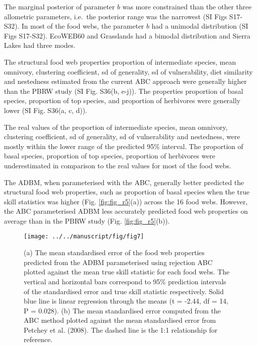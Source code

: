 \documentclass{article}
\begin{document}
The marginal posterior of parameter \(b\) was more constrained than the
other three allometric parameters, i.e.~the posterior range was the
narrowest (SI Figs S17-S32). In most of the food webs, the parameter
\(b\) had a unimodal distribution (SI Figs S17-S32). EcoWEB60 and
Grasslands had a bimodal distribution and Sierra Lakes had three modes.

The structural food web properties proportion of intermediate species,
mean omnivory, clustering coefficient, sd of generality, sd of
vulnerability, diet similarity and nestedness estimated from the current
ABC approach were generally higher than the PBRW study (SI Fig. S36(b,
e-j)). The properties proportion of basal species, proportion of top
species, and proportion of herbivores were generally lower (SI Fig.
S36(a, c, d)).

The real values of the proportion of intermediate species, mean
omnivory, clustering coefficient, sd of generality, sd of vulnerability
and nestedness, were mostly within the lower range of the predicted 95\%
interval. The proportion of basal species, proportion of top species,
proportion of herbivores were underestimated in comparison to the real
values for most of the food webs.

The ADBM, when parameterised with the ABC, generally better predicted
the structural food web properties, such as proportion of basal species
when the true skill statistics was higher (Fig. \ref{fig:fig_r5}(a))
across the 16 food webs. However, the ABC parameterised ADBM less
accurately predicted food web properties on average than in the PBRW
study (Fig. \ref{fig:fig_r5}(b)).

\begin{figure}

{\centering \texttt{[image: ../../manuscript/fig/fig7]} 

}

\caption{\label{fig:fig_r5} (a) The mean standardised error of the food web properties predicted from the ADBM parameterised using rejection ABC plotted against the mean true skill statistic for each food webs. The vertical and horizontal bars correspond to 95\% prediction intervals of the standardised error and true skill statistic respectively. Solid blue line is linear regression through the means (t = -2.44, df = 14, P = 0.028). (b) The mean standardised error computed from the ABC method plotted against the mean standardised error from Petchey et al. (2008). The dashed line is the 1:1 relationship for reference.}\label{fig:unnamed-chunk-8}
\end{figure}
\end{document}
